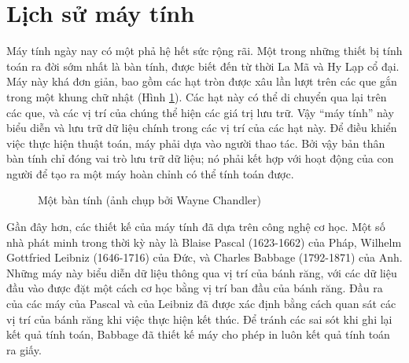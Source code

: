 \section{Lịch sử máy tính} 


Máy tính ngày nay có một phả hệ hết sức rộng rãi. Một trong những thiết bị tính toán ra
đời sớm nhất là bàn tính, được biết đến từ thời La Mã và Hy Lạp cổ đại. Máy này khá đơn
giản, bao gồm các hạt tròn được xâu lần lượt trên các que gắn trong một khung chữ nhật
(Hình \ref{fig:fig0.3}). Các hạt này có thể di chuyển qua lại trên các que, và các vị trí
của chúng thể hiện các giá trị lưu trữ. Vậy ``máy tính'' này biểu diễn và lưu trữ dữ liệu
chính trong các vị trí của các hạt này. Để điều khiển việc thực hiện thuật toán, máy phải
dựa vào người thao tác. Bởi vậy bản thân bàn tính chỉ đóng vai trò lưu trữ dữ liệu; nó
phải kết hợp với hoạt động của con người để tạo ra một máy hoàn chỉnh có thể tính toán
được.


\begin{figure}[tb]
\centering
\caption{Một bàn tính (ảnh chụp bởi Wayne Chandler)}
  \label{fig:fig0.3}
\end{figure}
 


Gần đây hơn, các thiết kế của máy tính đã dựa trên công nghệ cơ học. Một số nhà phát minh
trong thời kỳ này là Blaise Pascal (1623-1662) của Pháp, Wilhelm Gottfried Leibniz
(1646-1716) của Đức, và Charles Babbage (1792-1871) của Anh. Những máy này biểu diễn dữ
liệu thông qua vị trí của bánh răng, với các dữ liệu đầu vào được đặt một cách cơ học bằng
vị trí ban đầu của bánh răng.  Đầu ra của các máy của Pascal và của Leibniz đã được xác
định bằng cách quan sát các vị trí của bánh răng khi việc thực hiện kết thúc. Để tránh các sai sót khi ghi lại kết quả tính toán, 
Babbage đã thiết kế máy cho phép in luôn kết quả tính toán ra giấy.


